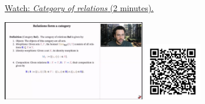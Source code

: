 
\begin{minipage}{10cm}
    \href{https://act4e-spring21.netlify.app/videos/spring2021-relations:relations:cat-rel.html}{Watch: \emph{Category of relations} (2 minutes).}
        
    \href{https://act4e-spring21.netlify.app/videos/spring2021-relations:relations:cat-rel.html}{\includegraphics[height=3.5cm]{spring2021-relations:relations:cat-rel/thumbnails.jpg}}
    \href{https://act4e-spring21.netlify.app/videos/spring2021-relations:relations:cat-rel.html}{\includegraphics[height=2.5cm]{spring2021-relations:relations:cat-rel/qrcode.png}}
\end{minipage}
